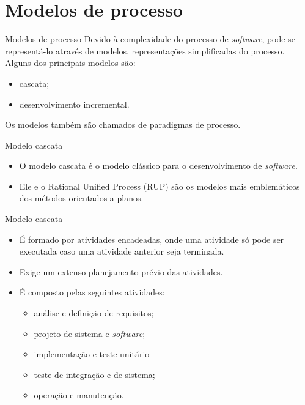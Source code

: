 \documentclass[11pt]{beamer}
\begin{document}
   \section{Modelos de processo}

   \begin{frame}{Modelos de processo}
      Devido à complexidade do processo de \textit{software}, pode-se representá-lo através de modelos, representações simplificadas do processo. Alguns dos principais modelos são:
      \begin{itemize}
         \item cascata;
         \item desenvolvimento incremental.
      \end{itemize}
      Os modelos também são chamados de paradigmas de processo.
   \end{frame}

   \begin{frame}{Modelo cascata}
      \begin{itemize}
         \item O modelo cascata é o modelo clássico para o desenvolvimento de \textit{software}.
         \item Ele e o Rational Unified Process (RUP) são os modelos mais emblemáticos dos métodos orientados a planos.
      \end{itemize}
   \end{frame}

   \begin{frame}{Modelo cascata}
      \begin{itemize}
         \item É formado por atividades encadeadas, onde uma atividade só pode ser executada caso uma atividade anterior seja terminada.
         \item Exige um extenso planejamento prévio das atividades.
         \item É composto pelas seguintes atividades:
           \begin{itemize}
              \item análise e definição de requisitos;
              \item projeto de sistema e \textit{software};
              \item implementação e teste unitário
              \item teste de integração e de sistema;
              \item operação e manutenção.
           \end{itemize}
      \end{itemize}
   \end{frame}
\end{document}
